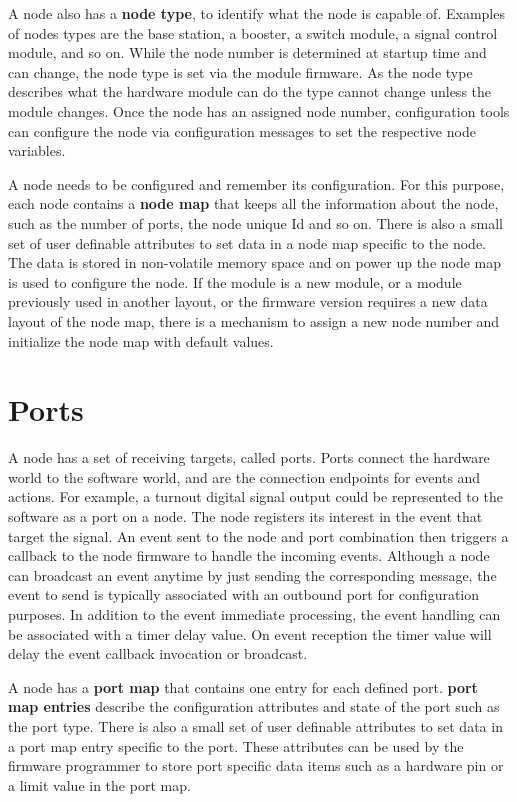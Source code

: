 A node also has a {\bf node type}, to identify what the node is capable of. Examples of nodes types are the base station, a booster, a switch module, a signal control module, and so on. While the node number is determined at startup time and can change, the node type is set via the module firmware. As the node type describes what the hardware module can do the type cannot change unless the module changes. Once the node has an assigned node number, configuration tools can configure the node via configuration messages to set the respective node variables.

A node needs to be configured and remember its configuration. For this purpose, each node contains a {\bf node map} that keeps all the information about the node, such as the number of ports, the node unique Id and so on. There is also a small set of user definable attributes to set data in a node map specific to the node. The data is stored in non-volatile memory space and on power up the node map is used to configure the node. If the module is a new module, or a module previously used in another layout, or the firmware version requires a new data layout of the node map, there is a mechanism to assign a new node number and initialize the node map with default values.

\section{Ports}

A node has a set of receiving targets, called ports. Ports connect the hardware world to the software world, and are the connection endpoints for events and actions. For example, a turnout digital signal output could be represented to the software as a port on a node. The node registers its interest in the event that target the signal. An event sent to the node and port combination then triggers a callback to the node firmware to handle the incoming events. Although a node can broadcast an event anytime by just sending the corresponding message, the event to send is typically associated with an outbound port for configuration purposes. In addition to the event immediate processing, the event handling can be associated with a timer delay value. On event reception the timer value will delay the event callback invocation or broadcast.

A node has a {\bf port map} that contains one entry for each defined port. {\bf port map entries} describe the configuration attributes and state of the port such as the port type. There is also a small set of user definable attributes to set data in a port map entry specific to the port. These attributes can be used by the firmware programmer to store port specific data items such as a hardware pin or a limit value in the port map.

